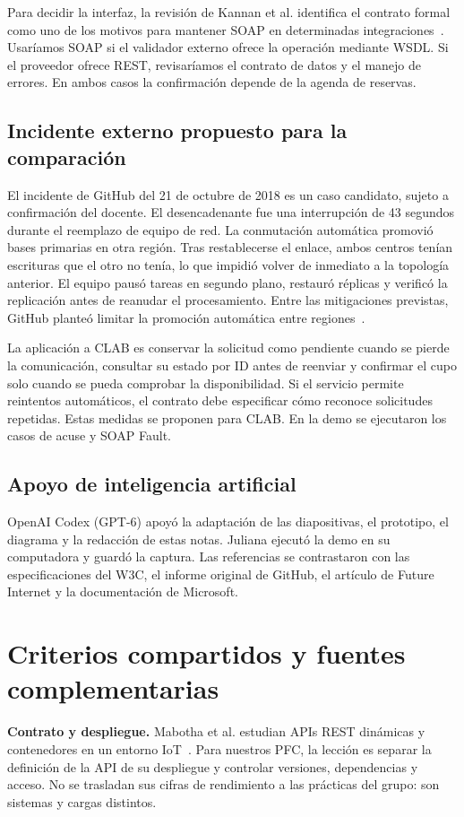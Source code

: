 \documentclass[10pt,a4paper,twocolumn]{article}
\begin{document}
Para decidir la interfaz, la revisión de Kannan et al. identifica el contrato formal como uno de los motivos para mantener SOAP en determinadas integraciones~\cite{kannan-soap-rest-2026}. Usaríamos SOAP si el validador externo ofrece la operación mediante WSDL. Si el proveedor ofrece REST, revisaríamos el contrato de datos y el manejo de errores. En ambos casos la confirmación depende de la agenda de reservas.

\subsection{Incidente externo propuesto para la comparación}
El incidente de GitHub del 21 de octubre de 2018 es un caso candidato, sujeto a confirmación del docente. El desencadenante fue una interrupción de 43 segundos durante el reemplazo de equipo de red. La conmutación automática promovió bases primarias en otra región. Tras restablecerse el enlace, ambos centros tenían escrituras que el otro no tenía, lo que impidió volver de inmediato a la topología anterior. El equipo pausó tareas en segundo plano, restauró réplicas y verificó la replicación antes de reanudar el procesamiento. Entre las mitigaciones previstas, GitHub planteó limitar la promoción automática entre regiones~\cite{warner-github-incidente-2018}.

La aplicación a CLAB es conservar la solicitud como pendiente cuando se pierde la comunicación, consultar su estado por ID antes de reenviar y confirmar el cupo solo cuando se pueda comprobar la disponibilidad. Si el servicio permite reintentos automáticos, el contrato debe especificar cómo reconoce solicitudes repetidas. Estas medidas se proponen para CLAB. En la demo se ejecutaron los casos de acuse y SOAP Fault.

\subsection{Apoyo de inteligencia artificial}
OpenAI Codex (GPT-6) apoyó la adaptación de las diapositivas, el prototipo, el diagrama y la redacción de estas notas. Juliana ejecutó la demo en su computadora y guardó la captura. Las referencias se contrastaron con las especificaciones del W3C, el informe original de GitHub, el artículo de Future Internet y la documentación de Microsoft.

\section{Criterios compartidos y fuentes complementarias}
\textbf{Contrato y despliegue.} Mabotha et al. estudian APIs REST dinámicas
y contenedores en un entorno IoT~\cite{mabotha_dockerized_2025}. Para nuestros PFC,
la lección es separar la definición de la API de su despliegue y controlar
versiones, dependencias y acceso. No se trasladan sus cifras de rendimiento
a las prácticas del grupo: son sistemas y cargas distintos.
\end{document}
